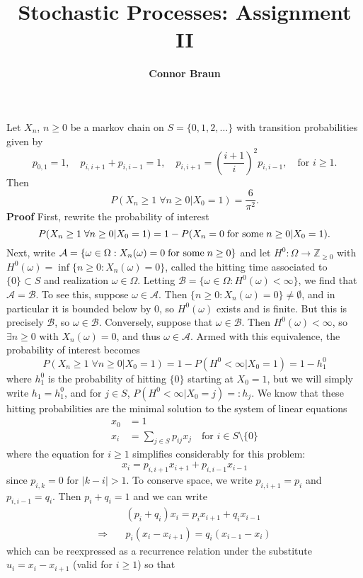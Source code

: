 \documentclass[11pt, letterpaper]{article}
\title{\bf Stochastic Processes: Assignment II}
\author{\bf Connor Braun}
\date{}
\newcommand{\mbb}[1]{\mathbb{#1}}
\newcommand{\mc}[1]{\mathcal{#1}}
\begin{document}
    \maketitle
     Let $X_n$, $n\geq 0$ be a markov chain on $S=\{0,1,2,\dots\}$ with transition probabilities given by
    \[p_{0,1}=1,\quad p_{i,i+1}+p_{i,i-1}=1,\quad p_{i,i+1}=\left(\frac{i+1}{i}\right)^2p_{i,i-1},\quad\text{for $i\geq 1$}.\]
    Then
    \[P(X_n\geq 1\;\forall n\geq 0|X_0=1)=\frac{6}{\pi^2}.\]
    {\bf Proof} First, rewrite the probability of interest
    \[P(X_n\geq 1\;\forall n\geq 0|X_0=1)=1-P(X_n=0\;\text{for some\;}n\geq 0|X_0=1).\]
    Next, write $\mc{A}=\{\omega\in\Omega:X_n(\omega)=0\;\text{for some\;}n\geq 0\}$ and let $H^0:\Omega\rightarrow \mbb{Z}_{\geq 0}$ with $H^0(\omega)=\inf\{n\geq 0:X_n(\omega)=0\}$,
    called the hitting time associated to $\{0\}\subset S$ and realization $\omega\in\Omega$. Letting $\mc{B}=\{\omega\in\Omega:H^0(\omega)<\infty\}$, we find that $\mc{A}=\mc{B}$. To see this, suppose $\omega\in\mc{A}$.
    Then $\{n\geq 0: X_n(\omega)=0\}\neq\emptyset$, and in particular it is bounded below by $0$, so $H^0(\omega)$ exists and is finite. But this is precisely $\mc{B}$, so $\omega\in\mc{B}$.
    Conversely, suppose that $\omega\in\mc{B}$. Then $H^0(\omega)<\infty$, so $\exists n\geq0$ with $X_n(\omega)=0$, and thus $\omega\in\mc{A}$. Armed with this equivalence, the probability of interest becomes
    \[P(X_n\geq 1\;\forall n\geq 0|X_0=1)=1-P(H^0<\infty|X_0=1)=1-h_1^0\tag{3}\]
    where $h_1^0$ is the probability of hitting $\{0\}$ starting at $X_0=1$, but we will simply write $h_1=h^0_1$, and for $j\in S$, $P(H^0<\infty|X_0=j)=:h_j$. We know that these hitting probabilities are the minimal solution to
    the system of linear equations
    \begin{align*}
        x_0&=1\\
        x_i&=\sum_{j\in S}p_{ij}x_j\quad\text{for $i\in S\setminus\{0\}$}
    \end{align*}
    where the equation for $i\geq 1$ simplifies considerably for this problem:
    \[x_i=p_{i,i+1}x_{i+1}+p_{i,i-1}x_{i-1}\]
    since $p_{i,k}=0$ for $|k-i|>1$. To conserve space, we write $p_{i,i+1}=p_i$ and $p_{i,i-1}=q_i$. Then $p_i+q_i=1$ and we can write
    \begin{align*}
        &(p_i+q_i)x_i=p_ix_{i+1}+q_ix_{i-1}\\
        \Rightarrow\quad&p_i(x_i-x_{i+1})=q_i(x_{i-1}-x_i)
    \end{align*}
    which can be reexpressed as a recurrence relation under the substitute $u_i=x_i-x_{i+1}$ (valid for $i\geq 1$) so that
\end{document}

